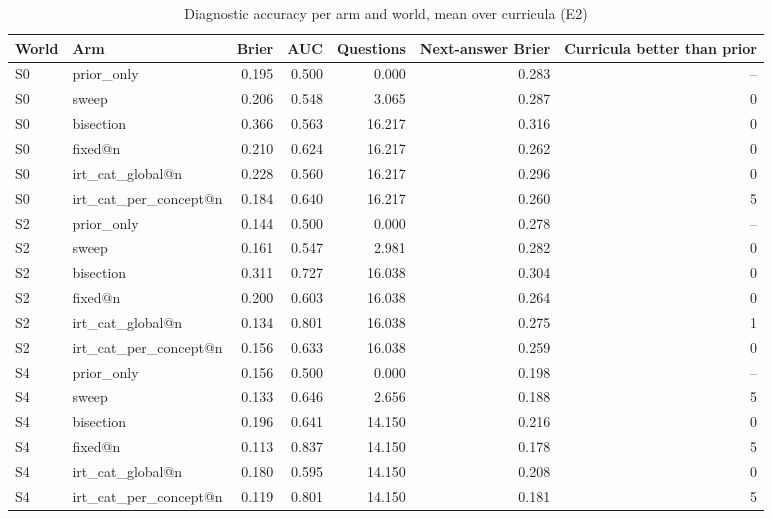 \begin{table}[htbp]
\centering\small
\caption{Diagnostic accuracy per arm and world, mean over curricula (E2)}
\label{tab:t3}
\begin{tabular}{llrrrrr}
\toprule
World & Arm & Brier & AUC & Questions & Next-answer Brier & Curricula better than prior \\
\midrule
S0 & prior\_only & 0.195 & 0.500 & 0.000 & 0.283 & -- \\
S0 & sweep & 0.206 & 0.548 & 3.065 & 0.287 & 0 \\
S0 & bisection & 0.366 & 0.563 & 16.217 & 0.316 & 0 \\
S0 & fixed@n & 0.210 & 0.624 & 16.217 & 0.262 & 0 \\
S0 & irt\_cat\_global@n & 0.228 & 0.560 & 16.217 & 0.296 & 0 \\
S0 & irt\_cat\_per\_concept@n & 0.184 & 0.640 & 16.217 & 0.260 & 5 \\
S2 & prior\_only & 0.144 & 0.500 & 0.000 & 0.278 & -- \\
S2 & sweep & 0.161 & 0.547 & 2.981 & 0.282 & 0 \\
S2 & bisection & 0.311 & 0.727 & 16.038 & 0.304 & 0 \\
S2 & fixed@n & 0.200 & 0.603 & 16.038 & 0.264 & 0 \\
S2 & irt\_cat\_global@n & 0.134 & 0.801 & 16.038 & 0.275 & 1 \\
S2 & irt\_cat\_per\_concept@n & 0.156 & 0.633 & 16.038 & 0.259 & 0 \\
S4 & prior\_only & 0.156 & 0.500 & 0.000 & 0.198 & -- \\
S4 & sweep & 0.133 & 0.646 & 2.656 & 0.188 & 5 \\
S4 & bisection & 0.196 & 0.641 & 14.150 & 0.216 & 0 \\
S4 & fixed@n & 0.113 & 0.837 & 14.150 & 0.178 & 5 \\
S4 & irt\_cat\_global@n & 0.180 & 0.595 & 14.150 & 0.208 & 0 \\
S4 & irt\_cat\_per\_concept@n & 0.119 & 0.801 & 14.150 & 0.181 & 5 \\
\bottomrule
\end{tabular}
\end{table}
